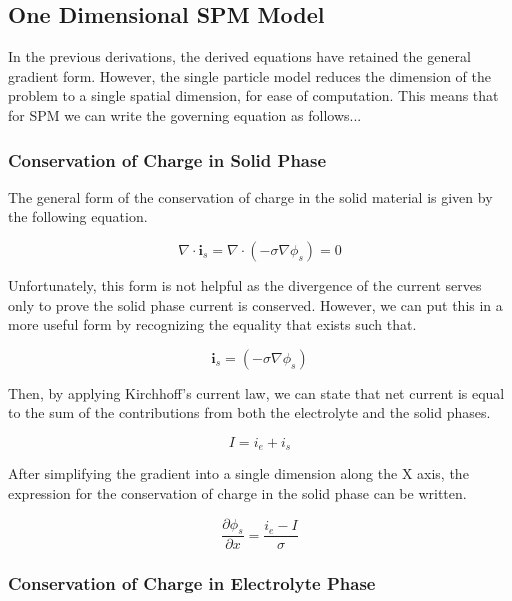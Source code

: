\documentclass[lettersize,journal]{IEEEtran}
\begin{document}
\subsection{One Dimensional SPM Model}

In the previous derivations, the derived equations have retained the general gradient form. However, the single particle model reduces the dimension of the problem to a single spatial dimension, for ease of computation. This means that for SPM we can write the governing equation as follows... \\

\subsubsection{Conservation of Charge in Solid Phase}

The general form of the conservation of charge in the solid material is given by the following equation.

\begin{equation}
\nabla \cdot \mathbf{i}_{s}=\nabla \cdot\left(-\sigma \nabla \phi_{s}\right)=0
\end{equation}

Unfortunately, this form is not helpful as the divergence of the current serves only to prove the solid phase current is conserved. However, we can put this in a more useful form by recognizing the equality that exists such that.

\begin{equation}
\mathbf{i}_{s}=\left(-\sigma \nabla \phi_{s}\right)
\end{equation}


Then, by applying Kirchhoff's current law, we can state that net current is equal to the sum of the contributions from both the electrolyte and the solid phases.

\begin{equation}
  I = i_e + i_s
\end{equation}

After simplifying the gradient into a single dimension along the X axis, the expression for the conservation of charge in the solid phase can be written.

\begin{equation}
\frac{\partial{\phi_{s}}}{\partial{x}} = \frac{i_e - I}{\sigma}
\end{equation}


\subsubsection{Conservation of Charge in Electrolyte Phase}
\end{document}
